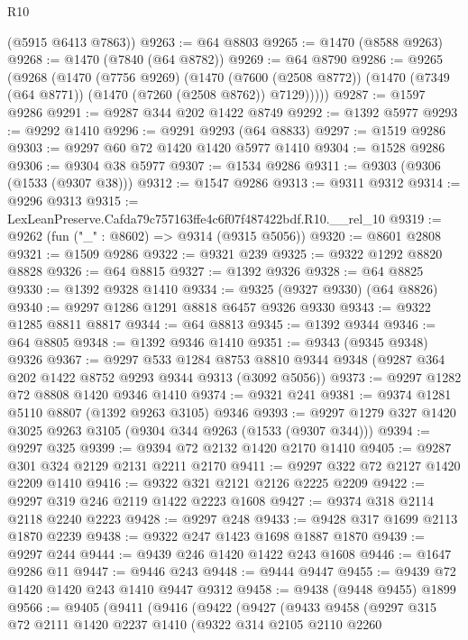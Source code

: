 \begin{lexlean}{R10}
\begin{coremodule}
      (@5915 @6413 @7863))
@9263 := @64 @8803
@9265 := @1470 (@8588 @9263)
@9268 := @1470 (@7840 (@64 @8782))
@9269 := @64 @8790
@9286 := @9265
    (@9268
      (@1470
        (@7756 @9269)
        (@1470
          (@7600 (@2508 @8772))
          (@1470 (@7349 (@64 @8771)) (@1470 (@7260 (@2508 @8762)) @7129)))))
@9287 := @1597 @9286
@9291 := @9287 @344 @202 @1422 @8749
@9292 := @1392 @5977
@9293 := @9292 @1410
@9296 := @9291 @9293 (@64 @8833)
@9297 := @1519 @9286
@9303 := @9297 @60 @72 @1420 @1420 @5977 @1410
@9304 := @1528 @9286
@9306 := @9304 @38 @5977
@9307 := @1534 @9286
@9311 := @9303 (@9306 (@1533 (@9307 @38)))
@9312 := @1547 @9286
@9313 := @9311 @9312
@9314 := @9296 @9313
@9315 := LexLeanPreserve.Cafda79c757163ffe4c6f07f487422bdf.R10.__rel_10
@9319 := @9262 (fun ("_" : @8602) => @9314 (@9315 @5056))
@9320 := @8601 @2808
@9321 := @1509 @9286
@9322 := @9321 @239
@9325 := @9322 @1292 @8820 @8828
@9326 := @64 @8815
@9327 := @1392 @9326
@9328 := @64 @8825
@9330 := @1392 @9328 @1410
@9334 := @9325 (@9327 @9330) (@64 @8826)
@9340 := @9297 @1286 @1291 @8818 @6457 @9326 @9330
@9343 := @9322 @1285 @8811 @8817
@9344 := @64 @8813
@9345 := @1392 @9344
@9346 := @64 @8805
@9348 := @1392 @9346 @1410
@9351 := @9343 (@9345 @9348) @9326
@9367 := @9297
    @533
    @1284
    @8753
    @8810
    @9344
    @9348
    (@9287 @364 @202 @1422 @8752 @9293 @9344 @9313 (@3092 @5056))
@9373 := @9297 @1282 @72 @8808 @1420 @9346 @1410
@9374 := @9321 @241
@9381 := @9374 @1281 @5110 @8807 (@1392 @9263 @3105) @9346
@9393 := @9297 @1279 @327 @1420 @3025 @9263 @3105 (@9304 @344 @9263 (@1533 (@9307 @344)))
@9394 := @9297 @325
@9399 := @9394 @72 @2132 @1420 @2170 @1410
@9405 := @9287 @301 @324 @2129 @2131 @2211 @2170
@9411 := @9297 @322 @72 @2127 @1420 @2209 @1410
@9416 := @9322 @321 @2121 @2126 @2225 @2209
@9422 := @9297 @319 @246 @2119 @1422 @2223 @1608
@9427 := @9374 @318 @2114 @2118 @2240 @2223
@9428 := @9297 @248
@9433 := @9428 @317 @1699 @2113 @1870 @2239
@9438 := @9322 @247 @1423 @1698 @1887 @1870
@9439 := @9297 @244
@9444 := @9439 @246 @1420 @1422 @243 @1608
@9446 := @1647 @9286 @11
@9447 := @9446 @243
@9448 := @9444 @9447
@9455 := @9439 @72 @1420 @1420 @243 @1410 @9447 @9312
@9458 := @9438 (@9448 @9455) @1899
@9566 := @9405
    (@9411
      (@9416
        (@9422
          (@9427
            (@9433
              @9458
              (@9297
                @315
                @72
                @2111
                @1420
                @2237
                @1410
                (@9322
                  @314
                  @2105
                  @2110
                  @2260

\end{coremodule}
\end{lexlean}
